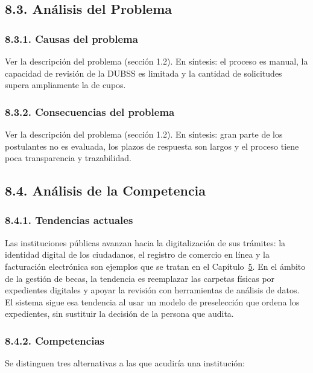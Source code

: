 \subsection{8.3. Análisis del Problema}

\subsubsection{8.3.1. Causas del problema}

Ver la descripción del problema (sección 1.2). En síntesis: el proceso es manual, la capacidad de revisión de la DUBSS es limitada y la cantidad de solicitudes supera ampliamente la de cupos.

\subsubsection{8.3.2. Consecuencias del problema}

Ver la descripción del problema (sección 1.2). En síntesis: gran parte de los postulantes no es evaluada, los plazos de respuesta son largos y el proceso tiene poca transparencia y trazabilidad.

\subsection{8.4. Análisis de la Competencia}

\subsubsection{8.4.1. Tendencias actuales}

Las instituciones públicas avanzan hacia la digitalización de sus trámites: la identidad digital de los ciudadanos, el registro de comercio en línea y la facturación electrónica son ejemplos que se tratan en el Capítulo~\hyperref[cap:legal]{5}. En el ámbito de la gestión de becas, la tendencia es reemplazar las carpetas físicas por expedientes digitales y apoyar la revisión con herramientas de análisis de datos. El sistema sigue esa tendencia al usar un modelo de preselección que ordena los expedientes, sin sustituir la decisión de la persona que audita.

\subsubsection{8.4.2. Competencias}

Se distinguen tres alternativas a las que acudiría una institución:

